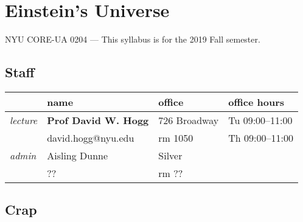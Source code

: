\documentclass[12pt]{article}
\begin{document}
\sloppy\sloppypar\raggedbottom\frenchspacing

\section*{Einstein's Universe}
NYU CORE-UA 0204 --- This syllabus is for the 2019 Fall semester.

\subsection*{Staff}
\noindent
\begin{tabular}{llll}
        & \textbf{name}      & \textbf{office} & \textbf{office hours} \\
\hline
\textit{lecture} & \textbf{Prof David W. Hogg} & 726 Broadway & Tu 09:00--11:00 \\
                 & david.hogg@nyu.edu          & rm 1050      & Th 09:00--11:00 \\
\hline
\textit{admin}   & Aisling Dunne               & Silver       \\
                 & ??                          & rm ??        \\
\hline
\end{tabular}

\subsection*{Crap}
\lipsum{}
\lipsum{}
\lipsum{}
\lipsum{}
\end{document}

